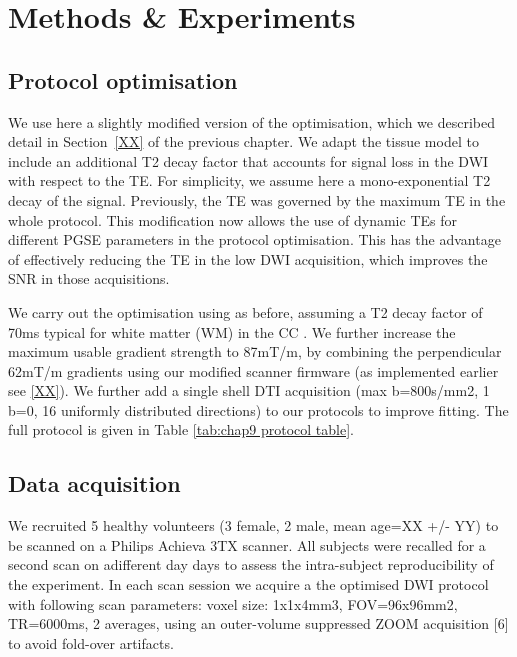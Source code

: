 \section{Methods \& Experiments}
\subsection*{Protocol optimisation}
We use here a slightly modified version of the \SFasym{} optimisation, which we described detail in Section~\ref{XX} of the previous chapter. We adapt the tissue model to include an additional T2 decay factor that accounts for signal loss in the DWI with respect to the \gls{TE}. For simplicity, we assume here a mono-exponential T2 decay of the signal. Previously, the \gls{TE} was governed by the maximum TE in the whole protocol. This modification now allows the use of dynamic \glspl{TE} for different PGSE parameters in the protocol optimisation. This has the advantage of effectively reducing the \gls{TE} in the low DWI acquisition, which improves the SNR in those acquisitions.



We carry out the optimisation using as before, assuming a T2 decay factor of 70ms typical for white matter (WM) in the CC \cite{cite stanisz relaxation times paper}. We further increase the maximum usable gradient strength to 87mT/m, by combining the perpendicular 62mT/m gradients using our modified scanner firmware (as implemented earlier see \ref{XX}). We further add a single shell DTI acquisition (max b=800s/mm2, 1 b=0, 16 uniformly distributed directions) to our protocols to improve fitting. The full protocol is given in Table \ref{tab:chap9 protocol table}.

\subsection*{Data acquisition}
We recruited 5 healthy volunteers (3 female, 2 male, mean age=XX +/- YY) to be scanned on a Philips Achieva 3TX scanner. All subjects were recalled for a second scan on adifferent day days to assess the intra-subject reproducibility of the experiment. In each scan session we acquire a the optimised \SF{} DWI protocol with following scan parameters: voxel size: 1x1x4mm3, FOV=96x96mm2, TR=6000ms, 2 averages, using an outer-volume suppressed ZOOM acquisition [6] to avoid fold-over artifacts.  
